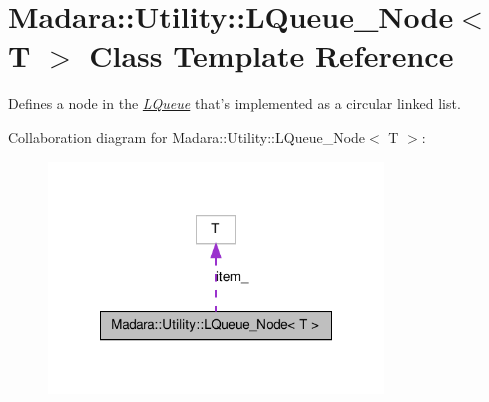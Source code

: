 \hypertarget{classMadara_1_1Utility_1_1LQueue__Node}{
\section{Madara::Utility::LQueue\_\-Node$<$ T $>$ Class Template Reference}
\label{da/d3c/classMadara_1_1Utility_1_1LQueue__Node}
}


Defines a node in the {\itshape \hyperlink{classMadara_1_1Utility_1_1LQueue}{LQueue}\/} that's implemented as a circular linked list.  




Collaboration diagram for Madara::Utility::LQueue\_\-Node$<$ T $>$:
\nopagebreak
\begin{figure}[H]
\begin{center}
\leavevmode
\includegraphics[width=252pt]{d1/db1/classMadara_1_1Utility_1_1LQueue__Node__coll__graph}
\end{center}
\end{figure}
